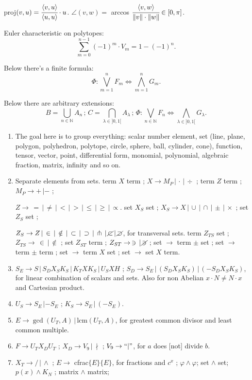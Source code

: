\documentclass[11pt,a4paper]{article}
\newenvironment{myenum}
{ \begin{enumerate}
    \setlength{\itemsep}{0pt}
    \setlength{\parskip}{0pt}
    \setlength{\parsep}{0pt}     }
{ \end{enumerate}                  }
\begin{document}
		proj$(v, u) = \cfrac{\langle v, u \rangle}{\langle u, u \rangle} \cdot u$. $\angle(v,w) =$ arccos $\cfrac{\langle v, w\rangle}{\Vert v\Vert \cdot \Vert w \Vert} \in [0, \pi]$.

		Euler characteristic on polytopes: $$\sum_{m = 0}^{n - 1} (-1)^m \cdot V_m = 1 - (-1)^n.$$

		Below there's a finite formula: $$\Phi:\bigvee_{m = 1}^n F_m\Leftrightarrow\bigwedge_{m = 1}^n G_m.$$

		Below there are arbitrary extensions: $$B = \bigcup_{n \in \mathbb{N}} A_n\,;\,C = \bigcap_{\lambda \in ]0,1[} A_\lambda\,;\,\Phi:\bigvee_{n \in \mathbb{N}} F_n\Leftrightarrow\bigwedge_{\lambda \in ]0,1[} G_\lambda.$$

		\begin{myenum}
		\item The goal here is to group everything: scalar number element, set (line, plane, polygon, polyhedron, polytope, circle, sphere, ball, cylinder, cone), function, tensor, vector, point, differential form, monomial, polynomial, algebraic fraction, matrix, infinity and so on.
		\item Separate elements from sets. term $X$ term ; $X \rightarrow M_P\,|\,\cdot\,|\,\div$ ; term $Z$ term ; $M_P \rightarrow +\,|-$ ;

		$Z \rightarrow\,=\,|\,\ne\,|\,<\,|\,>\,|\,\le\,|\,\ge\,|\,\propto$. set $X_S$ set ; $X_S \rightarrow X\,|\,\cup\,|\,\cap\,|\,\pm\,|\,\times$ ; set $Z_S$ set ;

		$Z_S \rightarrow Z\,|\,\in\,|\,\notin\,|\,\subset\,|\,\supset\,|\,\pitchfork\,|\,\cancel{\subset}\,|\,\cancel{\supset}$, for transversal sets. term $Z_{TS}$ set ; $Z_{TS} \rightarrow\,\in\,|\,\notin$ ; set $Z_{ST}$ term ; $Z_{ST} \rightarrow\,\ni\,|\,\cancel{\ni}$ ; set $\rightarrow$ term $\pm$ set ; set $\rightarrow$ term $\pm$ term ; set $\rightarrow$ term $X$ set ; set $\rightarrow$ set $X$ term.
		\item $S_E \rightarrow S\,|\,S_DX_SK_S\,|\,K_T X K_S\,|\,U_S X H$ ; $S_D \rightarrow S_E\,|\,(S_DX_SK_S)\,|\,(-S_DX_SK_S)$, for linear combination of scalars and sets. Also for non Abelian $x \cdot N \ne N \cdot x$ and Cartesian product.
		\item $U_S \rightarrow S_E\,| -S_E$ ; $K_S \rightarrow S_E\,|\,(-S_E)$.
		\item $E \rightarrow \gcd(U_T, A)\,|\,$lcm$(U_T, A)$, for greatest common divisor and least common multiple.
		\item $F \rightarrow U_TX_DU_T$ ; $X_D \rightarrow V_9\,|\,\nmid$ ; $V_9 \rightarrow ``|"$, for $a$ does [not] divide $b$.
		\item $X_T \rightarrow /\,|\,\wedge$ ; $E \rightarrow$ cfrac$\{E\}\{E\}$, for fractions and $c^x$ ; $\varphi\wedge\varphi$; set $\wedge$ set; $p(x)\wedge K_N$ ; matrix $\wedge$ matrix;


\end{myenum}
\end{document}
